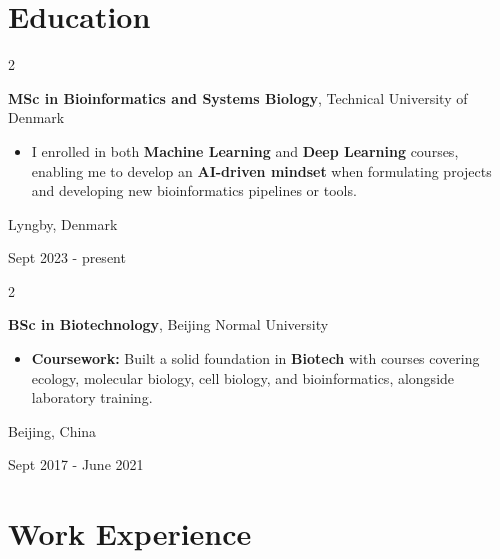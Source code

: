 \documentclass[10pt, letterpaper]{article}
\newenvironment{highlights}{
    \begin{itemize}[
        topsep=0.10 cm,
        parsep=0.10 cm,
        partopsep=0pt,
        itemsep=0pt,
        leftmargin=0.4 cm + 10pt
    ]
}{
    \end{itemize}
} %
\newenvironment{twocolentry}[2][]{
    \onecolentry
    \def\secondColumn{#2}
    \setcolumnwidth{\fill, 4.5 cm}
    \begin{paracol}{2}
}{
    \switchcolumn \raggedleft \secondColumn
    \end{paracol}
    \endonecolentry
} %
\begin{document}
    \section{Education}



        
        \begin{twocolentry}{
    Lyngby, Denmark

    Sept 2023 - present
}
    \textbf{MSc in Bioinformatics and Systems Biology}, Technical University of Denmark
    \begin{highlights}
        \item I enrolled in both \textbf{Machine Learning} and \textbf{Deep Learning} courses, enabling me to develop an \textbf{AI-driven mindset} when formulating projects and developing new bioinformatics pipelines or tools. 
    \end{highlights}
\end{twocolentry}


        \vspace{0.3 cm}

\begin{twocolentry}{
    Beijing, China
    
    Sept 2017 - June 2021
}
    \textbf{BSc in Biotechnology}, Beijing Normal University
    \begin{highlights}
        \item \textbf{Coursework:} Built a solid foundation in \textbf{Biotech} with courses covering ecology, molecular biology, cell biology, and bioinformatics, alongside laboratory training.
    \end{highlights}
\end{twocolentry}


    
    \section{Work Experience}
\end{document}
